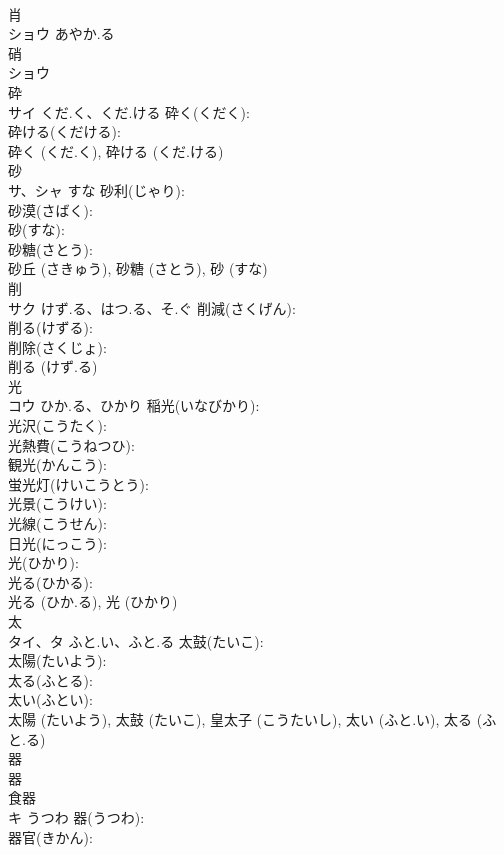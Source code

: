 \documentclass[8pt]{extreport}
\begin{document}
\begin{CJK}{UTF8}{min}
\\	肖			
\\	ショウ	あやか.る		
\\	硝			
\\	ショウ			
\\	砕			
\\	サイ	くだ.く、くだ.ける	砕く(くだく): 
\\	砕ける(くだける): 
\\	砕く (くだ.く), 砕ける (くだ.ける)
\\	砂			
\\	サ、シャ	すな	砂利(じゃり): 
\\	砂漠(さばく): 
\\	砂(すな): 
\\	砂糖(さとう): 
\\	砂丘 (さきゅう), 砂糖 (さとう), 砂 (すな)
\\	削			
\\	サク	けず.る、はつ.る、そ.ぐ	削減(さくげん): 
\\	削る(けずる): 
\\	削除(さくじょ): 
\\	削る (けず.る)
\\	光			
\\	コウ	ひか.る、ひかり	稲光(いなびかり): 
\\	光沢(こうたく): 
\\	光熱費(こうねつひ): 
\\	観光(かんこう): 
\\	蛍光灯(けいこうとう): 
\\	光景(こうけい): 
\\	光線(こうせん): 
\\	日光(にっこう): 
\\	光(ひかり): 
\\	光る(ひかる): 
\\	光る (ひか.る), 光 (ひかり)
\\	太			
\\	タイ、タ	ふと.い、ふと.る	太鼓(たいこ): 
\\	太陽(たいよう): 
\\	太る(ふとる): 
\\	太い(ふとい): 
\\	太陽 (たいよう), 太鼓 (たいこ), 皇太子 (こうたいし), 太い (ふと.い), 太る (ふと.る)
\\	器			
\\	器 
\\	食器 
\\	キ	うつわ	器(うつわ): 
\\	器官(きかん): 

\end{CJK}
\end{document}

